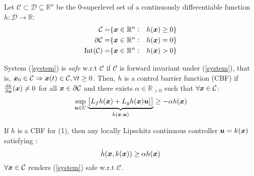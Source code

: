 \begin{definition} Let $\mathcal{C}\subset \mathcal{D}\subseteq \mathbb{R}^n$ be the $0$-superlevel set of a continuously  differentiable function $h:\mathcal{D}\to\mathbb{R}$:
\begin{equation}
\begin{aligned}
\mathcal{C} =& \{\boldsymbol{x}\in\mathbb{R}^n :& h(\boldsymbol{x})\geq 0\} \\
\partial{\mathcal{C}} =& \{\boldsymbol{x}\in\mathbb{R}^n :& h(\boldsymbol{x})= 0\} \\
\mathrm{Int}({\mathcal{C}}) =& \{\boldsymbol{x}\in\mathbb{R}^n :& h(\boldsymbol{x})> 0\} \\
\end{aligned}
\end{equation}
\end{definition}
\begin{definition} System (\ref{system}) is \textit{safe} w.r.t $\mathcal{C}$ if $\mathcal{C}$ is forward invariant under (\ref{system}), that is, $\boldsymbol{x}_0\in\mathcal{C}\Rightarrow \boldsymbol{x}(t)\in\mathcal{C}, \forall t\geq0$.
Then, $h$ is a control barrier function (CBF) if $\frac{\partial{h}}{\partial \boldsymbol{x}} (\boldsymbol{x})\neq 0$ for all $\boldsymbol{x}\in \partial{\mathcal{C}}$ and there exists $\alpha \in \mathbb{R}_{>0}$ such that $\forall \boldsymbol{x} \in \mathcal{C}$: 
\begin{equation}
\sup_{\boldsymbol{u}\in U} \underbrace{ 
\begin{bmatrix}
L_fh(\boldsymbol{x}) + L_gh(\boldsymbol{x})\boldsymbol{u}] 
\end{bmatrix}}_{\dot{h}(\boldsymbol{x},\boldsymbol{u})}\geq -\alpha h(\boldsymbol{x})
\end{equation}
\begin{theorem}
    \label{theorem1}If $h$ is a CBF for (1), then any locally Lipschitz continuous controller $\boldsymbol{u} = k(\boldsymbol{x})$ satisfying : 
\begin{equation}
\dot{h}(\boldsymbol{x},k(\boldsymbol{x}))\geq \alpha h(\boldsymbol{x})
\label{cond:2}
\end{equation}
$\forall{\boldsymbol{x}}\in\mathcal{C}$ renders (\ref{system}) safe w.r.t $\mathcal{C}$. 
\end{theorem}
\end{definition}


